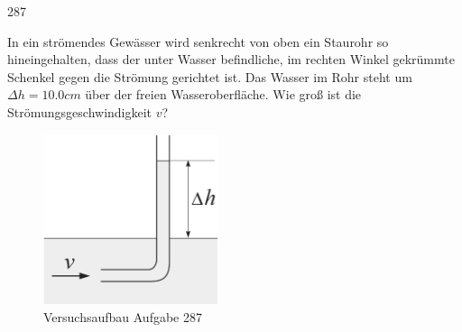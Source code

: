 \begin{auf}
    287
\end{auf}
In ein strömendes Gewässer wird senkrecht von oben ein Staurohr so hineingehalten, dass der unter Wasser befindliche, im rechten Winkel gekrümmte Schenkel gegen die Strömung gerichtet ist. Das Wasser im Rohr steht um $\Delta h=10.0cm$ über der freien Wasseroberfläche. Wie groß ist die Strömungsgeschwindigkeit $v$?
\begin{figure}[h]
    \centering
    \includegraphics[height=5cm]{images/287_0.png}
    \caption{Versuchsaufbau Aufgabe 287}
\end{figure}